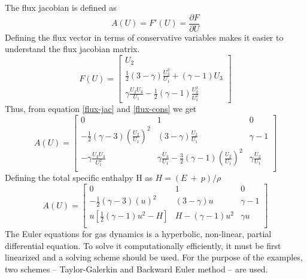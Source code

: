 \documentclass[12pt, oneside]{article}
\begin{document}
The flux jacobian is defined as 
\begin{equation}
    A(U) = F'(U) = \frac {\partial F} { \partial U}
    \label{flux-jac}
\end{equation}
Defining the flux vector in terms of conservative variables makes it easier to understand the flux jacobian matrix.
\begin{equation}
    F(U) =  \left[   \begin{matrix}
		U_2 \\
		\frac{1}{2} \left( 3 - \gamma \right)\frac{U_2^2}{U_1} + \left( \gamma - 1 \right)U_3 \\
		\gamma \frac{U_2 U_3}{U_1} - \frac{1}{2}\left( \gamma - 1 \right)\frac{U_2^2}{U_1^2}
       \end{matrix} \right]
       \label{flux-cons}
\end{equation}
Thus, from equation \ref{flux-jac} and \ref{flux-cons} we get
\begin{equation}
    A(U) = \left[
       \begin{matrix}
	    0 & 1 & 0 \\
	    -\frac{1}{2}\left( \gamma - 3 \right)\left( \frac{U_2}{U_1} \right)^2 & \left( 3 - \gamma \right)\frac{U_2}{U_1} & \gamma - 1 \\
	    -\gamma \frac{U_2 U_3}{U_1^2} & \gamma \frac{U_3}{U_1} - \frac{3}{2}\left( \gamma - 1 \right)\left( \frac{U_2}{U_1} \right)^2 & \gamma \frac{U_2}{U_1}\\
	    
       \end{matrix}
    \right]
    \label{flux-jac-cons}
\end{equation}
Defining the total specific enthalpy H as $H = (E\ +\ p)/\rho$
\begin{equation}
    A(U) = \left[
       \begin{matrix}
	    0 & 1 & 0 \\
	    -\frac{1}{2}\left( \gamma - 3 \right)\left( u\right)^2 & \left( 3 - \gamma \right) u & \gamma - 1 \\
	    u \left[ \frac{1}{2} \left( \gamma - 1 \right)u^2 - H \right] & H - \left( \gamma - 1 \right)u^2 & \gamma u\\
	    
       \end{matrix}
    \right]
    \label{flux-jac-con-mat}
\end{equation}
The Euler equations for gas dynamics is a hyperbolic, non-linear, partial differential equation. To solve it computationally efficiently, it must be first linearized and a solving scheme should be used. For the purpose of the examples, two schemes -- Taylor-Galerkin and Backward Euler method -- are used. 
\end{document}
